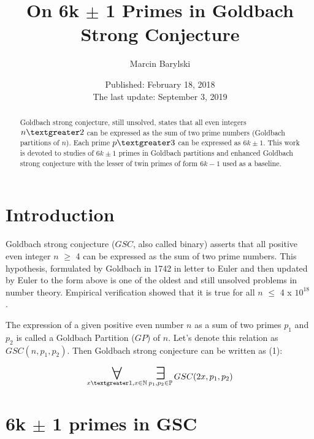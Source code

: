 \documentclass[10pt,twocolumn]{article}
\title{On 6k $\pm$ 1 Primes in Goldbach Strong Conjecture}
\author{Marcin Barylski}
\date{\small{Published: February 18, 2018 \\ The last update: September 3, 2019}}
\newcommand\bigforall{\mbox{\huge $\mathsurround0pt\forall$}}
\newcommand\bigexists{\mbox{\huge $\mathsurround0pt\exists$}}
\begin{document}
\maketitle

\begin{abstract}
Goldbach strong conjecture, still unsolved, states that all even integers $n \textgreater 2$ can be expressed as the sum of two prime numbers (Goldbach partitions of $n$). Each prime $p \textgreater 3$ can be expressed as $6k \pm 1$. This work is devoted to studies of $6k \pm 1$ primes in Goldbach partitions and enhanced Goldbach strong conjecture with the lesser of twin primes of form $6k - 1$ used as a baseline.
\end{abstract}

\section{Introduction}

Goldbach strong conjecture ($GSC$, also called binary) asserts that all positive even integer $n$ $\geq$ 4 can be expressed as the sum of two prime numbers. This hypothesis, formulated by Goldbach in 1742 in letter to Euler \cite{goldbach1742} and then updated by Euler to the form above is one of the oldest and still unsolved problems in number theory. Empirical verification showed that it is true for all $n$ $\leq$ 4 x $10^{18}$ \cite{oliveira2012} \cite{oliveira2013}.\par
The expression of a given positive even number $n$ as a sum of two primes $p_1$ and $p_2$ is called a Goldbach Partition ($GP$) of $n$.  Let's denote this relation as $GSC(n, p_1, p_2)$. Then Goldbach strong conjecture can be written as (1):

\begin{equation}
\displaystyle\mathop{\bigforall}_{x \textgreater 1, x \in \mathbb{N}} \displaystyle\mathop{\bigexists}_{p_1, p_2 \in \mathbb{P}} GSC (2x, p_1, p_2)
\end{equation}

\section{6k $\pm$ 1  primes in GSC}
\end{document}
